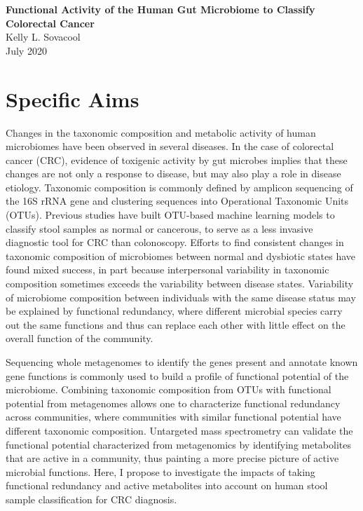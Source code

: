 \documentclass[11pt]{article}
\begin{document}
\sloppy

\begin{center}
\large{\textbf{
    Functional Activity of the Human Gut Microbiome to Classify Colorectal Cancer
}} \\
\vspace{11pt}
\small{
    Kelly L. Sovacool \\
    July 2020
}
\end{center}

\section*{Specific Aims} %

Changes in the taxonomic composition and metabolic activity of human microbiomes have been observed in several diseases.
In the case of colorectal cancer (CRC), evidence of toxigenic activity by gut microbes implies that these changes are not only a response to disease, but may also play a role in disease etiology.
Taxonomic composition is commonly defined by amplicon sequencing of the 16S rRNA gene and clustering sequences into Operational Taxonomic Units (OTUs).
Previous studies have built OTU-based machine learning models to classify stool samples as normal or cancerous, to serve as a less invasive diagnostic tool for CRC than colonoscopy.
Efforts to find consistent changes in taxonomic composition of microbiomes between normal and dysbiotic states have found mixed success, in part because interpersonal variability in taxonomic composition sometimes exceeds the variability between disease states.
Variability of microbiome composition between individuals with the same disease status may be explained by functional redundancy, where different microbial species carry out the same functions and thus can replace each other with little effect on the overall function of the community.

Sequencing whole metagenomes to identify the genes present and annotate known gene functions is commonly used to build a profile of functional potential of the microbiome.
Combining taxonomic composition from OTUs with functional potential from metagenomes allows one to characterize functional redundancy across communities, where communities with similar functional potential have different taxonomic composition.
Untargeted mass spectrometry can validate the functional potential characterized from metagenomics by identifying metabolites that are active in a community, thus painting a more precise picture of active microbial functions.
Here, I propose to investigate the impacts of taking functional redundancy and active metabolites into account on human stool sample classification for CRC diagnosis.
\end{document}
